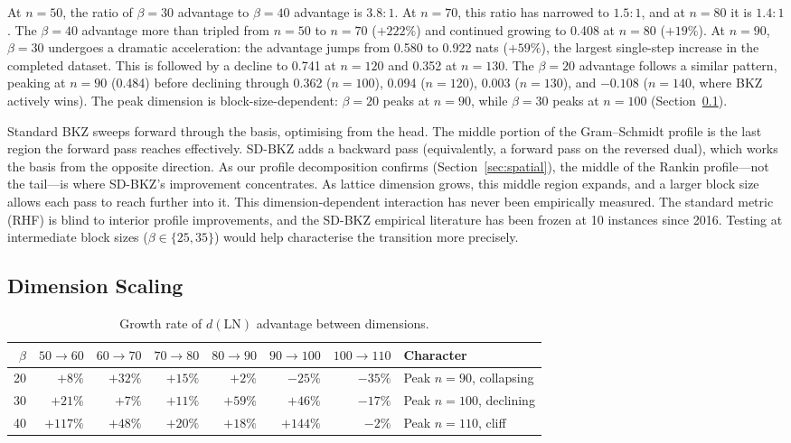 \documentclass[journal=cic,version=preprint]{iacrj}
\begin{document}
At $n=50$, the ratio of $\beta=30$ advantage to $\beta=40$ advantage is $3.8{:}1$. At $n=70$, this ratio has narrowed to $1.5{:}1$, and at $n=80$ it is $1.4{:}1$. The $\beta=40$ advantage more than tripled from $n=50$ to $n=70$ ($+222\%$) and continued growing to 0.408 at $n=80$ ($+19\%$). At $n=90$, $\beta=30$ undergoes a dramatic acceleration: the advantage jumps from 0.580 to 0.922 nats ($+59\%$), the largest single-step increase in the completed dataset. This is followed by a decline to 0.741 at $n=120$ and 0.352 at $n=130$. The $\beta=20$ advantage follows a similar pattern, peaking at $n=90$ (0.484) before declining through 0.362 ($n=100$), 0.094 ($n=120$), 0.003 ($n=130$), and $-0.108$ ($n=140$, where BKZ actively wins). The peak dimension is block-size-dependent: $\beta=20$ peaks at $n=90$, while $\beta=30$ peaks at $n=100$ (Section~\ref{sec:dim-scaling}).

Standard BKZ sweeps forward through the basis, optimising from the head. The middle portion of the Gram--Schmidt profile is the last region the forward pass reaches effectively. SD-BKZ adds a backward pass (equivalently, a forward pass on the reversed dual), which works the basis from the opposite direction. As our profile decomposition confirms (Section~\ref{sec:spatial}), the middle of the Rankin profile---not the tail---is where SD-BKZ's improvement concentrates. As lattice dimension grows, this middle region expands, and a larger block size allows each pass to reach further into it. This dimension-dependent interaction has never been empirically measured. The standard metric (RHF) is blind to interior profile improvements, and the SD-BKZ empirical literature has been frozen at 10 instances since 2016. Testing at intermediate block sizes ($\beta\in\{25, 35\}$) would help characterise the transition more precisely.

\subsection{Dimension Scaling}
\label{sec:dim-scaling}

\begin{table}[tbp]
\centering
\caption{Growth rate of $d(\mathrm{LN})$ advantage between dimensions.\label{tab:growth}}
\small
\begin{tabular}{rrrrrrrl}
\hline
$\beta$ & $50{\to}60$ & $60{\to}70$ & $70{\to}80$ & $80{\to}90$ & $90{\to}100$ & $100{\to}110$ & Character \\
\hline
20 & $+8\%$   & $+32\%$ & $+15\%$ & $+2\%$   & $-25\%$  & $-35\%$ & Peak $n{=}90$, collapsing \\
30 & $+21\%$  & $+7\%$  & $+11\%$ & $+59\%$  & $+46\%$  & $-17\%$ & Peak $n{=}100$, declining \\
40 & $+117\%$ & $+48\%$ & $+20\%$ & $+18\%$  & $+144\%$ & $-2\%$  & Peak $n{=}110$, cliff \\
\hline
\end{tabular}
\end{table}
\end{document}
